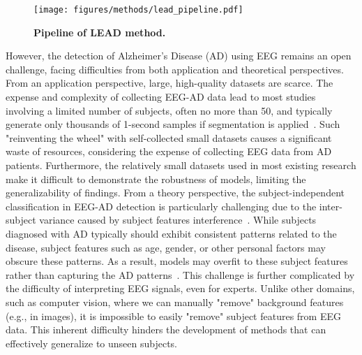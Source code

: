 \begin{figure}
    \centering
    \texttt{[image: figures/methods/lead\_pipeline.pdf]}
    \caption{\textbf{Pipeline of LEAD method.} 
    }
    \label{fig:lead_pipeline}
    \vspace{-5mm}
\end{figure}



However, the detection of Alzheimer's Disease (AD) using EEG remains an open challenge, facing difficulties from both application and theoretical perspectives. From an application perspective, large, high-quality datasets are scarce. The expense and complexity of collecting EEG-AD data lead to most studies involving a limited number of subjects, often no more than 50, and typically generate only thousands of 1-second samples if segmentation is applied~\cite{aviles2024machine}. Such "reinventing the wheel" with self-collected small datasets causes a significant waste of resources, considering the expense of collecting EEG data from AD patients. Furthermore, the relatively small datasets used in most existing research make it difficult to demonstrate the robustness of models, limiting the generalizability of findings. From a theory perspective, the subject-independent classification in EEG-AD detection is particularly challenging due to the inter-subject variance caused by subject features interference~\cite{wang2024medformer}. While subjects diagnosed with AD typically should exhibit consistent patterns related to the disease, subject features such as age, gender, or other personal factors may obscure these patterns. As a result, models may overfit to these subject features rather than capturing the AD patterns~\cite{wang2024evaluate}. This challenge is further complicated by the difficulty of interpreting EEG signals, even for experts. Unlike other domains, such as computer vision, where we can manually "remove" background features (e.g., in images), it is impossible to easily "remove" subject features from EEG data. This inherent difficulty hinders the development of methods that can effectively generalize to unseen subjects.



